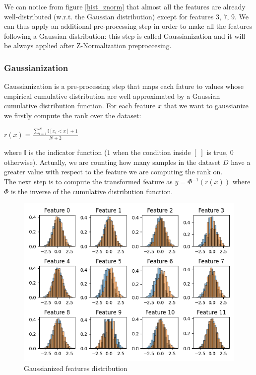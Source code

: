 \documentclass[10pt, a4paper, twocolumn]{article} %
\begin{document}
We can notice from figure \ref{hist_znorm} that almost all the features are already 
well-distributed (w.r.t. the Gaussian distribution) except for features 3, 7, 9. 
We can thus apply an additional pre-processing step in order to make all the features following a Gaussian distribution:
this step is called Gaussianization and it will be always applied after Z-Normalization preproccesing.

\subsubsection{Gaussianization}
Gaussianization is a pre-processing step that maps each fature to values whose empirical cumulative
distribution are well approximated by a Gaussian cumulative distribution function. For each
feature $x$ that we want to gaussianize we firstly compute the rank over the dataset:\\
\begin{center}
	\begin{math}
		r(x) = \frac{\sum_{i=1}^{N}\mathbb{I}[x_{i} < x] + 1}{N + 2}
	\end{math}
\end{center}
where $\mathbb{I}$ is the indicator function ($1$ when the condition inside $[\;]$ is true, $0$ 
otherwise). Actually, we are counting how many samples in the dataset $D$ have a greater value
with respect to the feature we are computing the rank on. \\
The next step is to compute the transformed feature as $y = \Phi^{-1}(r(x))$ where $\Phi$ is
the inverse of the cumulative distribution function. 

\begin{figure}[ht!]
	\includegraphics[width=\linewidth]{./Pictures/FeaturesAnalysis/hist_gau.png}
	\caption{Gaussianized features distribution}
	\label{hist_gau} 
\end{figure}
\end{document}
